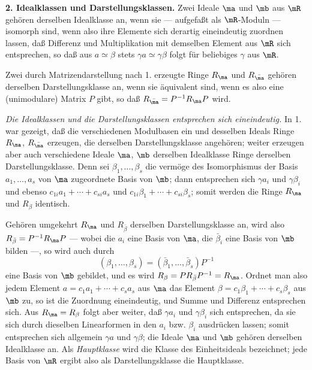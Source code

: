 \textbf{2. Idealklassen und Darstellungsklassen.} Zwei Ideale $\ma$ und $\mb$ aus $\mR$ gehören derselben Idealklasse an, wenn sie --- aufgefaßt als $\mR$-Moduln --- isomorph sind, wenn also ihre Elemente sich derartig eineindeutig zuordnen lassen, daß Differenz und Multiplikation mit demselben Element aus $\mR$ sich entsprechen, so daß aus $a\simeq\beta$ stets $\gamma a\simeq\gamma\beta$ folgt für beliebiges $\gamma$ aus $\mR$.

Zwei durch Matrizendarstellung nach 1. erzeugte Ringe $R_\ma$ und $R_{\bar\ma}$ gehören derselben Darstellungsklasse an, wenn sie äquivalent sind, wenn es also eine (unimodulare) Matrix $P$ gibt, so daß $R_{\bar\ma}=P^{-1}R_\ma P$ wird.

\emph{Die Idealklassen und die Darstellungsklassen entsprechen sich eineindeutig.} In 1. war gezeigt, daß die verschiedenen Modulbasen ein und desselben Ideals Ringe $R_\ma$, $R_{\bar\ma}$ erzeugen, die derselben Darstellungsklasse angehören; weiter erzeugen aber auch verschiedene Ideale $\ma$, $\mb$ derselben Idealklasse Ringe derselben Darstellungsklasse. Denn sei $\beta_1,\ldots,\beta_s$ die vermöge des Isomorphismus der Basis $a_1,\ldots,a_s$ von $\ma$ zugeordnete Basis von $\mb$; dann entsprechen sich $\gamma a_i$ und $\gamma\beta_i$ und ebenso $c_{1i}a_1+\cdots+c_{si}a_s$ und $c_{1i}\beta_1+\cdots+c_{si}\beta_s$; somit werden die Ringe $R_\ma$ und $R_\beta$ identisch.

Gehören umgekehrt $R_\ma$ und $R_{\bar\beta}$ derselben Darstellungsklasse an, wird also $R_{\bar\beta}=P^{-1}R_\ma P$ --- wobei die $a_i$ eine Basis von $\ma$, die $\bar\beta_i$ eine Basis von $\mb$ bilden ---, so wird auch durch
\[
(\beta_1,\ldots,\beta_s)=(\bar\beta_1,\ldots,\bar\beta_s)P^{-1}
\]
eine Basis von $\mb$ gebildet, und es wird $R_\beta=PR_{\bar\beta}P^{-1}=R_\ma$. Ordnet man also jedem Element $a=c_1a_1+\cdots+c_sa_s$ aus $\ma$ das Element $\beta=c_1\beta_1+\cdots+c_s\beta_s$ aus $\mb$ zu, so ist die Zuordnung eineindeutig, und Summe und Differenz entsprechen sich. Aus $R_\ma=R_\beta$ folgt aber weiter, daß $\gamma a_i$ und $\gamma\beta_i$ sich entsprechen, da sie sich durch dieselben Linearformen in den $a_i$ bzw. $\beta_i$ ausdrücken lassen; somit entsprechen sich allgemein $\gamma a$ und $\gamma\beta$; die Ideale $\ma$ und $\mb$ gehören derselben Idealklasse an. Als \emph{Hauptklasse} wird die Klasse des Einheitsideals bezeichnet; jede Basis von $\mR$ ergibt also als Darstellungsklasse die Hauptklasse.